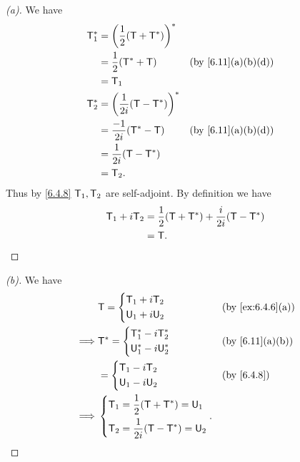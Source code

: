 \begin{proof}[(a)]
  We have
  \begin{align*}
    \T_1^* & = \pa{\dfrac{1}{2} (\T + \T^*)}^*                        \\
           & = \dfrac{1}{2} (\T^* + \T)         &  & \by{6.11}[a,b,d] \\
           & = \T_1                                                   \\
    \T_2^* & = \pa{\dfrac{1}{2i} (\T - \T^*)}^*                       \\
           & = \dfrac{-1}{2i} (\T^* - \T)       &  & \by{6.11}[a,b,d] \\
           & = \dfrac{1}{2i} (\T - \T^*)                              \\
           & = \T_2.
  \end{align*}
  Thus by \cref{6.4.8} \(\mathsf{T}_1, \mathsf{T}_2\) are self-adjoint.
  By definition we have
  \begin{align*}
    \mathsf{T}_1 + i \mathsf{T}_2 & = \dfrac{1}{2} (\mathsf{T} + \mathsf{T}^*) + \dfrac{i}{2i} (\mathsf{T} - \mathsf{T}^*) \\
                  & = \mathsf{T}.
  \end{align*}
\end{proof}

\begin{proof}[(b)]
  We have
  \begin{align*}
             & \T = \begin{dcases}
                      \T_1 + i \T_2 \\
                      \U_1 + i \U_2
                    \end{dcases}                       &  & \by{ex:6.4.6}[a] \\
    \implies & \T^* = \begin{dcases}
                        \T_1^* - i \T_2^* \\
                        \U_1^* - i \U_2^*
                      \end{dcases}                     &  & \by{6.11}[a,b]   \\
             & = \begin{dcases}
                   \T_1 - i \T_2 \\
                   \U_1 - i \U_2
                 \end{dcases}                          &  & \by{6.4.8}       \\
    \implies & \begin{dcases}
                 \T_1 = \dfrac{1}{2} (\T + \T^*) = \U_1 \\
                 \T_2 = \dfrac{1}{2i} (\T - \T^*) = \U_2
               \end{dcases}.
  \end{align*}
\end{proof}

